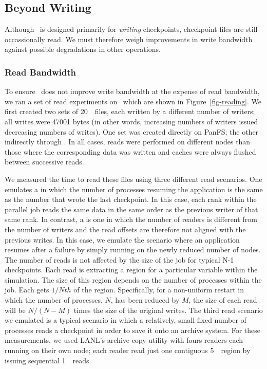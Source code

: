 \subsection{Beyond Writing}
Although \plfs\ is designed primarily for {\em writing} checkpoints,
checkpoint files are still occassionally read.
We must therefore weigh improvements in 
write bandwidth against possible degradations in other operations. 

\subsubsection{Read Bandwidth}


To ensure \plfs\ does not improve write bandwidth at the expense of read
bandwidth, we ran a set of read experiments on \rrz\ which are shown in
Figure~\ref{fig-reading}. We first created two sets of 20~\GB\ files, each
written by a different number of writers; all writes were 47001 bytes (in other
words, increasing numbers of writers issued decreasing numbers of writes). One
set was created directly on PanFS; the other indirectly through \plfs. In all
cases, reads were performed on different nodes than those where the
corresponding data was written and caches were always flushed between
successive reads.

We measured the time to read these files using three different read
scenarios. One emulates a  in which the number of
processes resuming the application is the same as the number that wrote the
last checkpoint. In this case, each rank within the parallel job reads the
same data in the same order as the previous writer of that same rank. In
contrast, a  is one in which the number of
readers is different from the number of writers and the read offsets are
therefore not aligned with the previous writes. In this case, we emulate the
scenario where an application resumes after a failure by simply running on the
newly reduced number of nodes. The number of reads is not affected by the size
of the job for typical N-1 checkpoints. Each read is extracting a region for a
particular variable within the simulation. The size of this region depends on
the number of processes within the job. Each gets $1/Nth$ of the region.
Specifically, for a non-uniform restart in which the number of processes, $N$,
has been reduced by $M$, the size of each read will be $N/(N-M)$ times the size
of the original writes. The third read scenario we emulated is a typical
scenario in which a relatively, small fixed number of processes reads a
checkpoint in order to save it onto an archive system. For these measurements,
we used LANL's archive copy utility with fours readers each running on their
own node; each reader read just one contiguous 5~\GB\ region by issuing 
sequential 1~\MB\ reads. 

